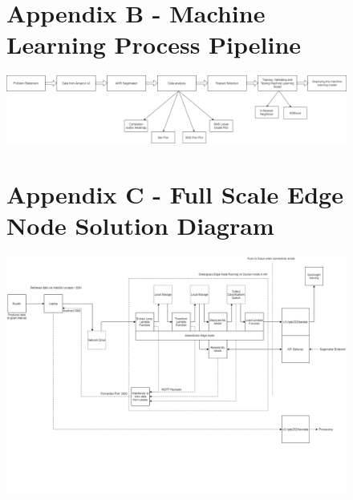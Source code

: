     
\begin{landscape}
\begin{figure}[ht]
\begin{minipage}{\linewidth}
\section{Appendix B - Machine Learning Process Pipeline}

   \centering
    \includegraphics[width=0.99\linewidth]{pages/Chapter3/Chapter 3 images/Ml.png}
    
    \label{appendix:ML process pipeline}

\end{minipage}
\end{figure}
    \end{landscape}
    
    
\begin{landscape}
\begin{figure}[ht]
\begin{minipage}{\linewidth}
\section{Appendix C - Full Scale Edge Node Solution Diagram}

   \centering
    \includegraphics[width=1\linewidth]{pages/Chapter3/Chapter 3 images/greengrass_data_flow.png}
    
    \label{appendix:greengrass_design}

\end{minipage}
\end{figure}
    \end{landscape}
    

